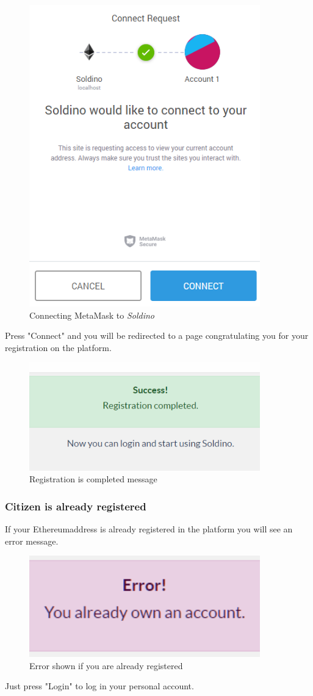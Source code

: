 	\begin{figure}[H]
		\includegraphics[width=10cm]{res/images/metamask_connect.png}
		\centering
		\caption{Connecting MetaMask to \textit{Soldino}}
	\end{figure}
	\noindent Press "Connect" and you will be redirected to a page 
	congratulating you for your registration on the platform.
	\begin{figure}[H]
		\includegraphics[width=10cm]{res/images/registration_complete.png}
		\centering
		\caption{Registration is completed message}
	\end{figure}
		\subsubsection{Citizen is already registered}
		If your Ethereum\glosp address is already registered in the platform you will 
		see an error message.
		\begin{figure}[H]
			\includegraphics[width=10cm]{res/images/user_already_registered.png}
			\centering
			\caption{Error shown if you are already registered}
		\end{figure}
		\noindent Just press "Login" to log in your personal account.
